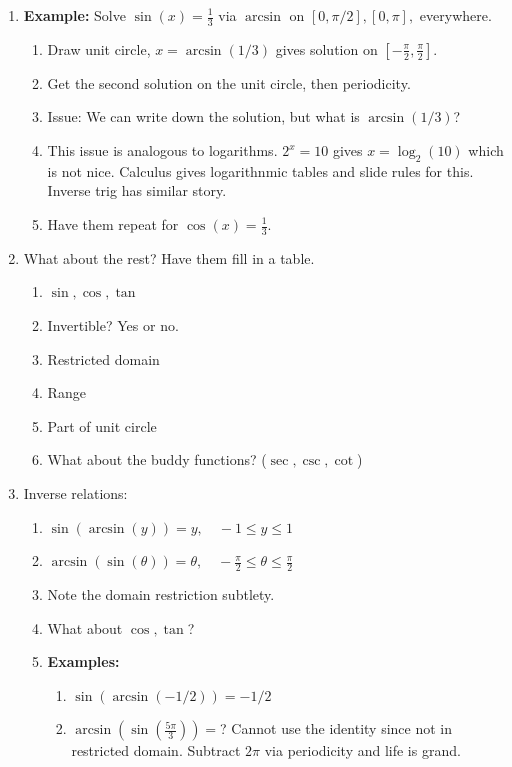 \documentclass{article}
\begin{document}
\begin{enumerate}
\item {\bf Example:} Solve $\sin(x) = \frac{1}{3}$ via $\arcsin$ on $[0,\pi/2], [0, \pi],$ everywhere.
\begin{enumerate}
\item Draw unit circle, $x=\arcsin(1/3)$ gives solution on $[-\frac{\pi}{2},\frac{\pi}{2}]$.
\item Get the second solution on the unit circle, then periodicity.
\item Issue: We can write down the solution, but what is $\arcsin(1/3)$?
\item This issue is analogous to logarithms. $2^x=10$ gives $x=\log_2(10)$ which is not nice. Calculus gives logarithnmic tables and slide rules for this. Inverse trig has similar story.
\item Have them repeat for $\cos(x) = \frac{1}{3}$.
\end{enumerate}

\item What about the rest? Have them fill in a table.
\begin{enumerate}
\item $\sin, \cos, \tan$
\item Invertible? Yes or no.
\item Restricted domain
\item Range
\item Part of unit circle
\item What about the buddy functions? ($\sec, \csc, \cot$)
\end{enumerate}

\item Inverse relations:
\begin{enumerate}
\item $\sin(\arcsin(y)) = y, \quad -1\leq y \leq 1$
\item $\arcsin(\sin(\theta)) = \theta, \quad -\frac{\pi}{2}\leq \theta \leq \frac{\pi}{2}$
\item Note the domain restriction subtlety.
\item What about $\cos,\tan$?
\item {\bf Examples:}
\begin{enumerate}
\item $\sin(\arcsin(-1/2)) = -1/2$
\item $\arcsin(\sin(\frac{5\pi}{3})) = $? Cannot use the identity since not in restricted domain. Subtract $2\pi$ via periodicity and life is grand.
\end{enumerate}
\end{enumerate}


\end{enumerate}
\end{document}

